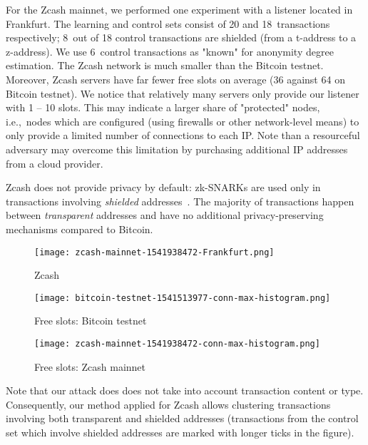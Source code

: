 For the Zcash mainnet, we performed one experiment with a listener located in Frankfurt.
The learning and control sets consist of 20 and 18~transactions respectively; 8~out of 18 control transactions are shielded (from a t-address to a z-address).
We use 6~control transactions as "known" for anonymity degree estimation.
The Zcash network is much smaller than the Bitcoin testnet.
Moreover, Zcash servers have far fewer free slots on average (36 against 64 on Bitcoin testnet).
We notice that relatively many servers only provide our listener with 1 -- 10 slots.
This may indicate a larger share of "protected" nodes, i.e.,~nodes which are configured (using firewalls or other network-level means) to only provide a limited number of connections to each IP.
Note than a resourceful adversary may overcome this limitation by purchasing additional IP addresses from a cloud provider.

Zcash does not provide privacy by default: zk-SNARKs are used only in transactions involving \textit{shielded} addresses~\cite{Kappos2018}.
The majority of transactions happen between \textit{transparent} addresses and have no additional privacy-preserving mechanisms compared to Bitcoin.

\begin{figure}[!t]
	\centering
	\texttt{[image: zcash-mainnet-1541938472-Frankfurt.png]}
	\caption{Zcash}
	\label{fig:zcash-mainnet}
\end{figure}

\begin{figure*}
	\centering
	\begin{minipage}{0.5\textwidth}
		\centering
		\texttt{[image: bitcoin-testnet-1541513977-conn-max-histogram.png]}
		\caption{Free slots: Bitcoin testnet}
	\end{minipage}\hfill
	\begin{minipage}{0.5\textwidth}
		\centering
		\texttt{[image: zcash-mainnet-1541938472-conn-max-histogram.png]}
		\caption{Free slots: Zcash mainnet}
	\end{minipage}\hfill
	\label{fig:free-slots}
\end{figure*}

Note that our attack does does not take into account transaction content or type.
Consequently, our method applied for Zcash allows clustering transactions involving both transparent and shielded addresses (transactions from the control set which involve shielded addresses are marked with longer ticks in the figure).


